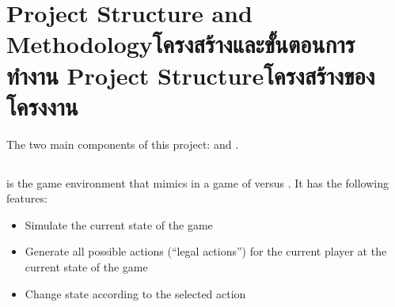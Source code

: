 \chapter{\ifproject%
\ifenglish Project Structure and Methodology\else โครงสร้างและขั้นตอนการทำงาน\fi
\else%
\ifenglish Project Structure\else โครงสร้างของโครงงาน\fi
\fi
}

The two main components of this project: \RootOurs{} and \RootAI.


\makeatletter


\makeatother

\section{\RootOurs}
\RootOurs{} is the game environment that mimics \RootV{} in a game of \Marquise{} versus \Eyrie. It has the following features:
\begin{itemize}
  \item Simulate the current state of the game
  \item Generate all possible actions (``legal actions'') for the current player at the current state of the game
  \item Change state according to the selected action 
\end{itemize}


